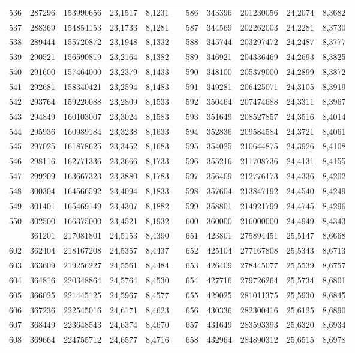 \begin{longtable}{rrrrrrrrrrr}
536&287296&153990656&23,1517&8,1231&&586&343396&201230056&24,2074&8,3682\\
537&288369&154854153&23,1733&8,1281&&587&344569&202262003&24,2281&8,3730\\
538&289444&155720872&23,1948&8,1332&&588&345744&203297472&24,2487&8,3777\\
539&290521&156590819&23,2164&8,1382&&589&346921&204336469&24,2693&8,3825\\
540&291600&157464000&23,2379&8,1433&&590&348100&205379000&24,2899&8,3872\\
541&292681&158340421&23,2594&8,1483&&591&349281&206425071&24,3105&8,3919\\
542&293764&159220088&23,2809&8,1533&&592&350464&207474688&24,3311&8,3967\\
543&294849&160103007&23,3024&8,1583&&593&351649&208527857&24,3516&8,4014\\
544&295936&160989184&23,3238&8,1633&&594&352836&209584584&24,3721&8,4061\\
545&297025&161878625&23,3452&8,1683&&595&354025&210644875&24,3926&8,4108\\
546&298116&162771336&23,3666&8,1733&&596&355216&211708736&24,4131&8,4155\\
547&299209&163667323&23,3880&8,1783&&597&356409&212776173&24,4336&8,4202\\
548&300304&164566592&23,4094&8,1833&&598&357604&213847192&24,4540&8,4249\\
549&301401&165469149&23,4307&8,1882&&599&358801&214921799&24,4745&8,4296\\
550&302500&166375000&23,4521&8,1932&&600&360000&216000000&24,4949&8,4343\\
\newpage
601&361201&217081801&24,5153&8,4390&&651&423801&275894451&25,5147&8,6668\\
602&362404&218167208&24,5357&8,4437&&652&425104&277167808&25,5343&8,6713\\
603&363609&219256227&24,5561&8,4484&&653&426409&278445077&25,5539&8,6757\\
604&364816&220348864&24,5764&8,4530&&654&427716&279726264&25,5734&8,6801\\
605&366025&221445125&24,5967&8,4577&&655&429025&281011375&25,5930&8,6845\\
606&367236&222545016&24,6171&8,4623&&656&430336&282300416&25,6125&8,6890\\
607&368449&223648543&24,6374&8,4670&&657&431649&283593393&25,6320&8,6934\\
608&369664&224755712&24,6577&8,4716&&658&432964&284890312&25,6515&8,6978\\

\end{longtable}
